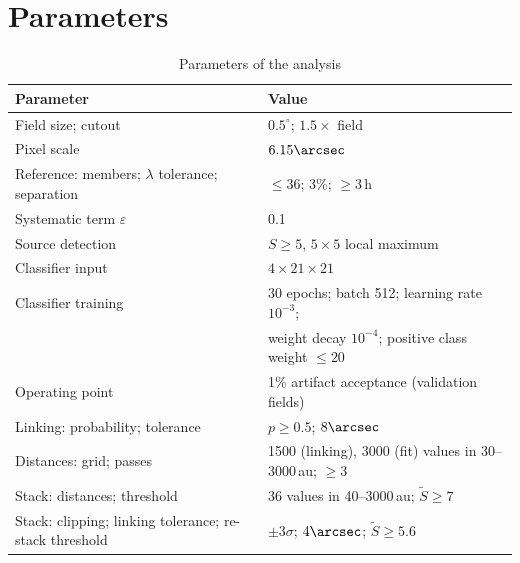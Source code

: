\documentclass[twocolumn,linenumbers]{aastex702}
\begin{document}
\section{Parameters}\label{app:set}
\begin{table}[h]
\centering
\caption{Parameters of the analysis\label{tab:set}}
\begin{tabular}{ll}
\hline\hline
Parameter & Value \\
\hline
Field size; cutout & $0.5^\circ$; $1.5\times$ field \\
Pixel scale & $6.15\arcsec$ \\
Reference: members; $\lambda$ tolerance; separation & $\le 36$; 3\%; $\ge 3$\,h \\
Systematic term $\varepsilon$ & 0.1 \\
Source detection & $S \ge 5$, $5\times5$ local maximum \\
Classifier input & $4 \times 21 \times 21$ \\
Classifier training & 30 epochs; batch 512; learning rate $10^{-3}$;\\
 & weight decay $10^{-4}$; positive class weight $\le 20$ \\
Operating point & 1\% artifact acceptance (validation fields) \\
Linking: probability; tolerance & $p \ge 0.5$; $8\arcsec$ \\
Distances: grid; passes & 1500 (linking), 3000 (fit) values in 30--3000\,au; $\ge 3$ \\
Stack: distances; threshold & 36 values in 40--3000\,au; $\widetilde{S} \ge 7$ \\
Stack: clipping; linking tolerance; re-stack threshold & $\pm 3\sigma$; $4\arcsec$; $\widetilde{S} \ge 5.6$ \\
\hline
\end{tabular}
\end{table}
\end{document}
